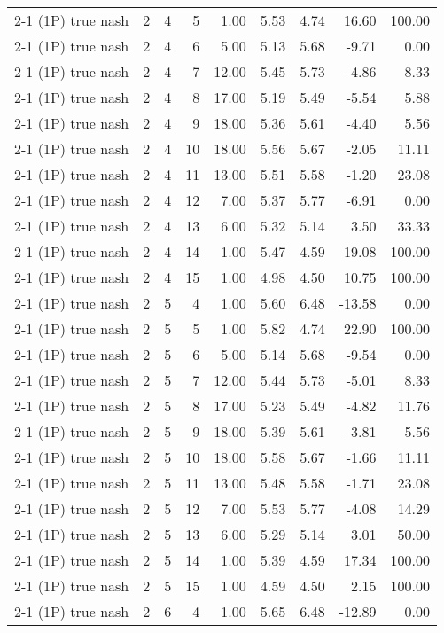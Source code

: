 \begin{tabular}{lrrrrrrrr}
2-1 (1P) true nash & 2 & 4 & 5 & 1.00 & 5.53 & 4.74 & 16.60 & 100.00 \\
2-1 (1P) true nash & 2 & 4 & 6 & 5.00 & 5.13 & 5.68 & -9.71 & 0.00 \\
2-1 (1P) true nash & 2 & 4 & 7 & 12.00 & 5.45 & 5.73 & -4.86 & 8.33 \\
2-1 (1P) true nash & 2 & 4 & 8 & 17.00 & 5.19 & 5.49 & -5.54 & 5.88 \\
2-1 (1P) true nash & 2 & 4 & 9 & 18.00 & 5.36 & 5.61 & -4.40 & 5.56 \\
2-1 (1P) true nash & 2 & 4 & 10 & 18.00 & 5.56 & 5.67 & -2.05 & 11.11 \\
2-1 (1P) true nash & 2 & 4 & 11 & 13.00 & 5.51 & 5.58 & -1.20 & 23.08 \\
2-1 (1P) true nash & 2 & 4 & 12 & 7.00 & 5.37 & 5.77 & -6.91 & 0.00 \\
2-1 (1P) true nash & 2 & 4 & 13 & 6.00 & 5.32 & 5.14 & 3.50 & 33.33 \\
2-1 (1P) true nash & 2 & 4 & 14 & 1.00 & 5.47 & 4.59 & 19.08 & 100.00 \\
2-1 (1P) true nash & 2 & 4 & 15 & 1.00 & 4.98 & 4.50 & 10.75 & 100.00 \\
2-1 (1P) true nash & 2 & 5 & 4 & 1.00 & 5.60 & 6.48 & -13.58 & 0.00 \\
2-1 (1P) true nash & 2 & 5 & 5 & 1.00 & 5.82 & 4.74 & 22.90 & 100.00 \\
2-1 (1P) true nash & 2 & 5 & 6 & 5.00 & 5.14 & 5.68 & -9.54 & 0.00 \\
2-1 (1P) true nash & 2 & 5 & 7 & 12.00 & 5.44 & 5.73 & -5.01 & 8.33 \\
2-1 (1P) true nash & 2 & 5 & 8 & 17.00 & 5.23 & 5.49 & -4.82 & 11.76 \\
2-1 (1P) true nash & 2 & 5 & 9 & 18.00 & 5.39 & 5.61 & -3.81 & 5.56 \\
2-1 (1P) true nash & 2 & 5 & 10 & 18.00 & 5.58 & 5.67 & -1.66 & 11.11 \\
2-1 (1P) true nash & 2 & 5 & 11 & 13.00 & 5.48 & 5.58 & -1.71 & 23.08 \\
2-1 (1P) true nash & 2 & 5 & 12 & 7.00 & 5.53 & 5.77 & -4.08 & 14.29 \\
2-1 (1P) true nash & 2 & 5 & 13 & 6.00 & 5.29 & 5.14 & 3.01 & 50.00 \\
2-1 (1P) true nash & 2 & 5 & 14 & 1.00 & 5.39 & 4.59 & 17.34 & 100.00 \\
2-1 (1P) true nash & 2 & 5 & 15 & 1.00 & 4.59 & 4.50 & 2.15 & 100.00 \\
2-1 (1P) true nash & 2 & 6 & 4 & 1.00 & 5.65 & 6.48 & -12.89 & 0.00 \\

\end{tabular}
